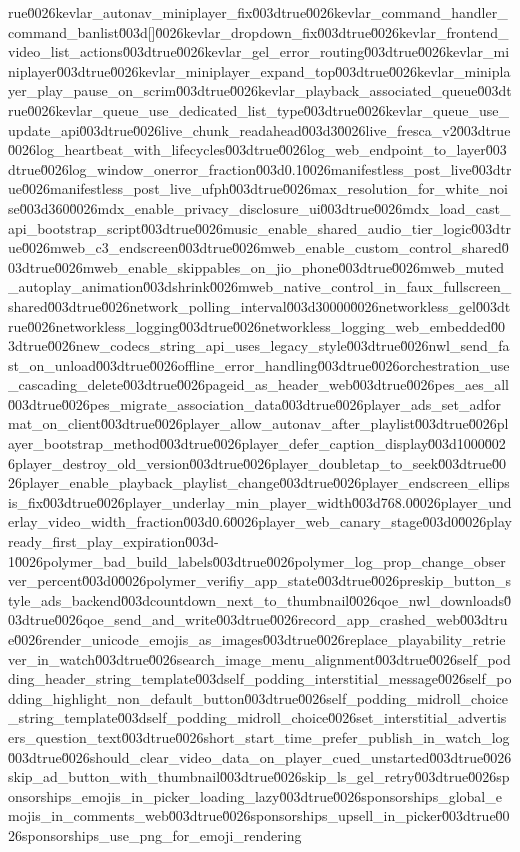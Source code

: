 {rue\u0026kevlar_autonav_miniplayer_fix\u003dtrue\u0026kevlar_command_handler_command_banlist\u003d[]\u0026kevlar_dropdown_fix\u003dtrue\u0026kevlar_frontend_video_list_actions\u003dtrue\u0026kevlar_gel_error_routing\u003dtrue\u0026kevlar_miniplayer\u003dtrue\u0026kevlar_miniplayer_expand_top\u003dtrue\u0026kevlar_miniplayer_play_pause_on_scrim\u003dtrue\u0026kevlar_playback_associated_queue\u003dtrue\u0026kevlar_queue_use_dedicated_list_type\u003dtrue\u0026kevlar_queue_use_update_api\u003dtrue\u0026live_chunk_readahead\u003d3\u0026live_fresca_v2\u003dtrue\u0026log_heartbeat_with_lifecycles\u003dtrue\u0026log_web_endpoint_to_layer\u003dtrue\u0026log_window_onerror_fraction\u003d0.1\u0026manifestless_post_live\u003dtrue\u0026manifestless_post_live_ufph\u003dtrue\u0026max_resolution_for_white_noise\u003d360\u0026mdx_enable_privacy_disclosure_ui\u003dtrue\u0026mdx_load_cast_api_bootstrap_script\u003dtrue\u0026music_enable_shared_audio_tier_logic\u003dtrue\u0026mweb_c3_endscreen\u003dtrue\u0026mweb_enable_custom_control_shared\u003dtrue\u0026mweb_enable_skippables_on_jio_phone\u003dtrue\u0026mweb_muted_autoplay_animation\u003dshrink\u0026mweb_native_control_in_faux_fullscreen_shared\u003dtrue\u0026network_polling_interval\u003d30000\u0026networkless_gel\u003dtrue\u0026networkless_logging\u003dtrue\u0026networkless_logging_web_embedded\u003dtrue\u0026new_codecs_string_api_uses_legacy_style\u003dtrue\u0026nwl_send_fast_on_unload\u003dtrue\u0026offline_error_handling\u003dtrue\u0026orchestration_use_cascading_delete\u003dtrue\u0026pageid_as_header_web\u003dtrue\u0026pes_aes_all\u003dtrue\u0026pes_migrate_association_data\u003dtrue\u0026player_ads_set_adformat_on_client\u003dtrue\u0026player_allow_autonav_after_playlist\u003dtrue\u0026player_bootstrap_method\u003dtrue\u0026player_defer_caption_display\u003d1000\u0026player_destroy_old_version\u003dtrue\u0026player_doubletap_to_seek\u003dtrue\u0026player_enable_playback_playlist_change\u003dtrue\u0026player_endscreen_ellipsis_fix\u003dtrue\u0026player_underlay_min_player_width\u003d768.0\u0026player_underlay_video_width_fraction\u003d0.6\u0026player_web_canary_stage\u003d0\u0026playready_first_play_expiration\u003d-1\u0026polymer_bad_build_labels\u003dtrue\u0026polymer_log_prop_change_observer_percent\u003d0\u0026polymer_verifiy_app_state\u003dtrue\u0026preskip_button_style_ads_backend\u003dcountdown_next_to_thumbnail\u0026qoe_nwl_downloads\u003dtrue\u0026qoe_send_and_write\u003dtrue\u0026record_app_crashed_web\u003dtrue\u0026render_unicode_emojis_as_images\u003dtrue\u0026replace_playability_retriever_in_watch\u003dtrue\u0026search_image_menu_alignment\u003dtrue\u0026self_podding_header_string_template\u003dself_podding_interstitial_message\u0026self_podding_highlight_non_default_button\u003dtrue\u0026self_podding_midroll_choice_string_template\u003dself_podding_midroll_choice\u0026set_interstitial_advertisers_question_text\u003dtrue\u0026short_start_time_prefer_publish_in_watch_log\u003dtrue\u0026should_clear_video_data_on_player_cued_unstarted\u003dtrue\u0026skip_ad_button_with_thumbnail\u003dtrue\u0026skip_ls_gel_retry\u003dtrue\u0026sponsorships_emojis_in_picker_loading_lazy\u003dtrue\u0026sponsorships_global_emojis_in_comments_web\u003dtrue\u0026sponsorships_upsell_in_picker\u003dtrue\u0026sponsorships_use_png_for_emoji_rendering}
